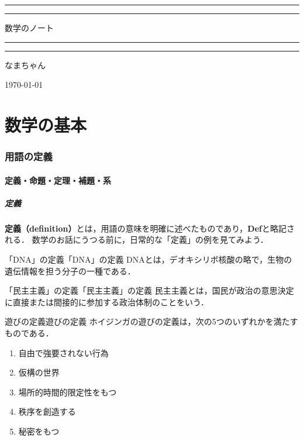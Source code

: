 \documentclass[a4paper,11pt]{ltjsarticle}
\renewcommand{\emph}[1]{\textbf{#1}}
\newcommand{\tituloum}[5]{
  \begin{titlepage}
    \begin{center}
        \pagecolor{white} %
        \color{mypurple} %
        
        \vspace*{2\baselineskip}
        
        \textcolor{mypurple}{\rule{\textwidth}{1.6pt}}\vspace*{-\baselineskip}\vspace*{2pt}
        \textcolor{mypurple}{\rule{\textwidth}{0.4pt}}
        
        \vspace{0.75\baselineskip}
        
        {\huge #1}
        
        \vspace{0.75\baselineskip}
        
        \textcolor{mypurple}{\rule{\textwidth}{0.4pt}}\vspace*{-\baselineskip}\vspace{3.2pt}
        \textcolor{mypurple}{\rule{\textwidth}{1.6pt}}
        
        \vspace{2\baselineskip}
        
        #3
        
        \vspace*{3\baselineskip}
        
        {\huge #2}
        
        \vspace{0.5\baselineskip}
        
        \textit{#4}
        
        \vfill
        
        \vspace{0.3\baselineskip}
        
        #5
        
    \end{center}
\end{titlepage}%
}
\begin{document}
\tituloum{数学のノート}{なまちゃん}{}{}{\today}

%

\thispagestyle{empty}

\newpage
{}
\pagecolor{white}

\localtableofcontents
\newpage 


\part*{数学の基本}
\section{用語の定義}

\subsection{定義・命題・定理・補題・系}

\subsubsection{定義}

\emph{定義（definition）}とは，用語の意味を明確に述べたものであり，\textbf{Def}と略記される．
数学のお話にうつる前に，日常的な「定義」の例を見てみよう．

\begin{example}{「DNA」の定義}{「DNA」の定義}
DNAとは，デオキシリボ核酸の略で，生物の遺伝情報を担う分子の一種である．
\end{example}

\begin{example}{「民主主義」の定義}{「民主主義」の定義}
民主主義とは，国民が政治の意思決定に直接または間接的に参加する政治体制のことをいう．
\end{example}

\begin{example}{遊びの定義}{遊びの定義}
  ホイジンガの遊びの定義は，次の5つのいずれかを満たすものである．
  \begin{enumerate}[(1)]
    \item 自由で強要されない行為
    \item 仮構の世界
    \item 場所的時間的限定性をもつ
    \item 秩序を創造する
    \item 秘密をもつ
  \end{enumerate}
  \end{example}
\end{document}
